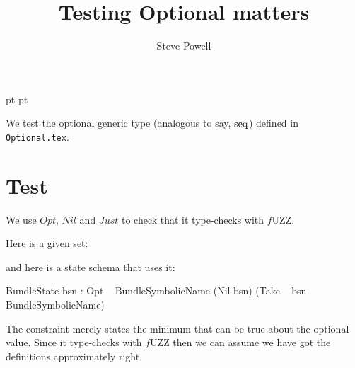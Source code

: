 \documentclass[a4paper,titlepage,twoside,12pt]{article}
\begin{document}
 pt
 pt

\title{Testing Optional matters}
\author{Steve Powell}
\maketitle
\thispagestyle{myheadings}
\setcounter{page}{0}

We test the optional generic type (analogous to say, $\mathop{\mathrm{seq}}$) defined in \texttt{Optional.tex}.



\newcommand{\true}{true}
\newcommand{\false}{false}
\renewcommand{\emptyset}{\varnothing}
\newcommand{\defaultsTo}{\mathbin{\sf defaultsTo}}

\clearpage
\tableofcontents

\clearpage
{}
\section{Test}
We use $Opt$, $Nil$ and $Just$ to check that it type-checks with $f$UZZ.

Here is a given set:

\begin{zed}
	[BundleSymbolicName]
\end{zed}
and here is a state schema that uses it:
\begin{schema}{BundleState}
	bsn : Opt ~ BundleSymbolicName
\where
	(Nil \neq bsn) \implies (Take ~ bsn \in BundleSymbolicName) 
\end{schema}
The constraint merely states the minimum that can be true about the optional value. Since it type-checks with $f$UZZ then we can assume we have got the definitions approximately right.
\end{document}
